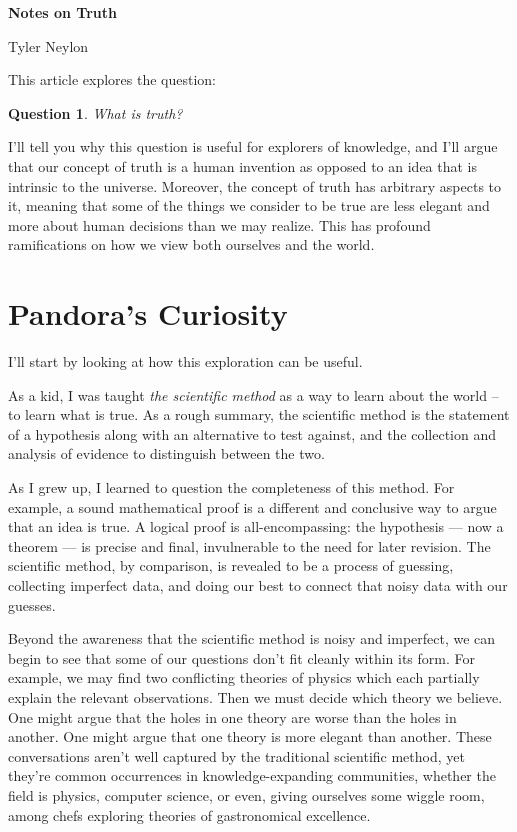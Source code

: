 \documentclass[11pt, oneside]{article}   	%
\newtheorem{question}{Question}
\begin{document}
{\bf Notes on Truth}

Tyler Neylon

\bigskip

This article explores the question:
\begin{question}\label{q1}
    What is truth?
\end{question}

I'll tell you why this question is useful for explorers of knowledge, and
I'll argue that our concept of truth is a human invention as opposed to an idea
that is intrinsic to the universe.
Moreover, the concept of truth has arbitrary aspects to it, meaning that some of
the things we consider to be true are less elegant and more about human
decisions than
we may realize. This has profound ramifications on how we
view both ourselves and the world.

\section{Pandora's Curiosity}

I'll start by looking at how this exploration can be useful.

As a kid, I was taught {\em the scientific method} as a way to
learn about the world -- to learn what is true.
As a rough summary,
the scientific method is the statement
of a hypothesis along with an alternative to test against, and
the collection and analysis of evidence to distinguish between
the two.

As I grew up, I
learned to question the completeness of this method.
For example, a sound mathematical proof is a different and
conclusive way
to argue that an idea is true.
A logical proof is all-encompassing: the hypothesis --- now a theorem
--- is
precise and final,
invulnerable to the need for later revision.
The scientific method, by comparison, is revealed to be
a process of guessing, collecting imperfect data, and doing our best to
connect that noisy data with our guesses.

Beyond the awareness that the scientific method is noisy and imperfect, we can
begin to see that some of our questions don't fit cleanly within its form.
For example, we may find two conflicting theories of physics which
each partially explain the relevant observations. Then we must decide
which theory we believe. One might argue that the holes in one theory are worse
than the holes in another. One might argue that one theory is more elegant than
another.
These conversations aren't well captured by the traditional
scientific method, yet
they're common occurrences in knowledge-expanding communities,
whether the field is physics, computer science, or even, giving
ourselves some wiggle room, among chefs exploring theories of gastronomical
excellence.
\end{document}
